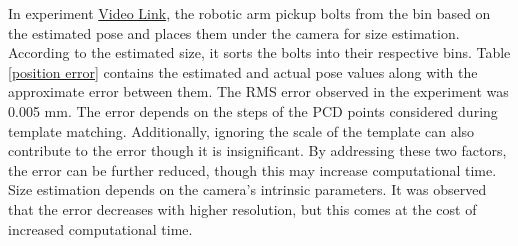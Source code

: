 \documentclass[conference]{IEEEtran}
\begin{document}
\begin{table}[ht]
\caption{Table representing position error}
\centering
{}
\label{position error}
\end{table}
In experiment \href{https://youtu.be/pg9PinbhQ50}{Video Link}, the robotic arm pickup bolts from the bin based on the estimated pose and places them under the camera for size estimation. According to the estimated size, it sorts the bolts into their respective bins. Table \ref{position error} contains the estimated and actual pose values along with the approximate error between them. The RMS error observed in the experiment was 0.005 mm. The error depends on the steps of the PCD points considered during template matching. Additionally, ignoring the scale of the template can also contribute to the error though it is insignificant. By addressing these two factors, the error can be further reduced, though this may increase computational time. Size estimation depends on the camera's intrinsic parameters. It was observed that the error decreases with higher resolution, but this comes at the cost of increased computational time. 
\end{document}
